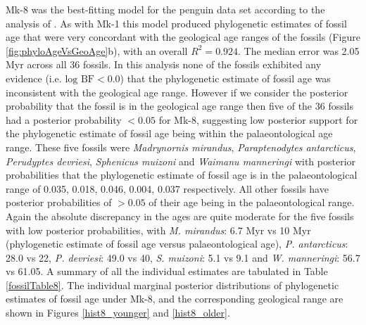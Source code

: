 \documentclass[11pt]{article}
\newcommand{\Mstrict}{{Mk-1}}
\newcommand{\Mrelaxed}{{Mk-8}}
\begin{document}
\Mrelaxed{} was the best-fitting model for the penguin data set according to the analysis of \cite{gavryushkina2015bayesian}. 
As with \Mstrict{} this model produced phylogenetic estimates of fossil age that were very concordant with the geological age ranges of the fossils (Figure \ref{fig:phyloAgeVsGeoAge}b), with an overall $R^2 = 0.924$. The median error was 2.05 Myr across all 36 fossils. 
In this analysis none of the fossils exhibited any evidence (i.e. $\text{log BF} < 0.0$) that the phylogenetic estimate of fossil age was inconsistent with the geological age range. 
However if we consider the posterior probability that the fossil is in the geological age range then five of the 36 fossils had a posterior probability $< 0.05$ for \Mrelaxed{}, suggesting low posterior support for the phylogenetic estimate of fossil age being within the palaeontological age range. 
These five fossils were {\em Madrynornis mirandus}, {\em Paraptenodytes antarcticus}, {\em Perudyptes devriesi}, {\em Sphenicus muizoni} and {\em Waimanu manneringi} with posterior probabilities that the phylogenetic estimate of fossil age is in the palaeontological range of 0.035, 0.018, 0.046, 0.004, 0.037 respectively. 
All other fossils have posterior probabilities of $> 0.05$ of their age being in the palaeontological range. 
Again the absolute discrepancy in the ages are quite moderate for the five fossils with low posterior probabilities, with {\em M. mirandus}: 6.7 Myr vs 10 Myr (phylogenetic estimate of fossil age versus palaeontological age), {\em P. antarcticus}: 28.0 vs 22, {\em P. devriesi}: 49.0 vs 40, {\em S. muizoni}: 5.1 vs 9.1 and {\em W. manneringi}: 56.7 vs 61.05. 
A summary of all the individual estimates are tabulated in Table \ref{fossilTable8}. 
The individual marginal posterior distributions of phylogenetic estimates of fossil age under \Mrelaxed{}, and the corresponding geological range are shown in Figures \ref{hist8_younger} and \ref{hist8_older}.
\end{document}
